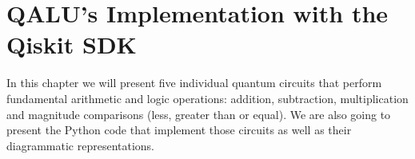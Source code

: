 \chapter{QALU's Implementation with the Qiskit SDK}

In this chapter we will present five individual quantum circuits that perform fundamental arithmetic and logic
operations: addition, subtraction, multiplication and magnitude comparisons (less, greater than or equal). We
are also going to present the Python code that implement those circuits as well as their diagrammatic representations.





